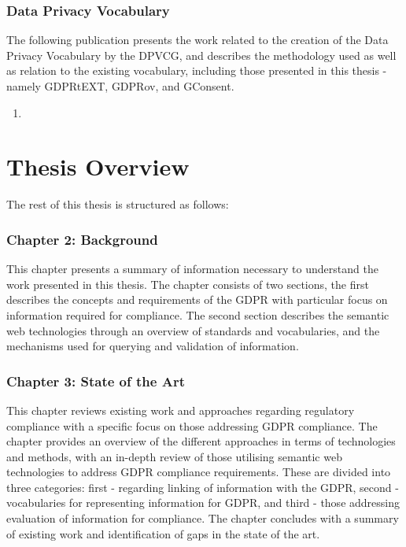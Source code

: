 \subsubsection{Data Privacy Vocabulary}
The following publication presents the work related to the creation of the Data Privacy Vocabulary by the DPVCG, and describes the methodology used as well as relation to the existing vocabulary, including those presented in this thesis - namely GDPRtEXT, GDPRov, and GConsent.
\begin{enumerate}[resume]
    \item \textbf{}
\end{enumerate}

\section{Thesis Overview}
The rest of this thesis is structured as follows:

\subsubsection{Chapter 2: Background}
This chapter presents a summary of information necessary to understand the work presented in this thesis. The chapter consists of two sections, the first describes the concepts and requirements of the GDPR with particular focus on information required for compliance. The second section describes the semantic web technologies through an overview of standards and vocabularies, and the mechanisms used for querying and validation of information.

\subsubsection{Chapter 3: State of the Art}
This chapter reviews existing work and approaches regarding regulatory compliance with a specific focus on those addressing GDPR compliance. The chapter provides an overview of the different approaches in terms of technologies and methods, with an in-depth review of those utilising semantic web technologies to address GDPR compliance requirements. These are divided into three categories: first - regarding linking of information with the GDPR, second - vocabularies for representing information for GDPR, and third - those addressing evaluation of information for compliance. The chapter concludes with a summary of existing work and identification of gaps in the state of the art.

